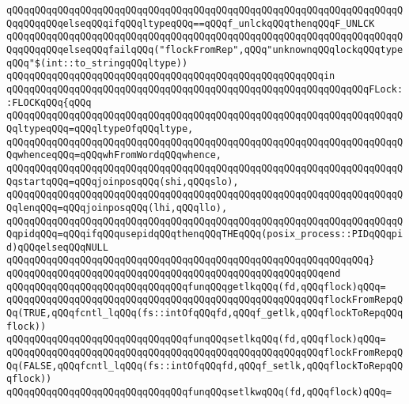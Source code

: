 \verb|qQQqqQQqqQQqqQQqqQQqqQQqqQQqqQQqqQQqqQQqqQQqqQQqqQQqqQQqqQQqqQQqqQQqqQQqqQQqqQQqelseqQQqifqQQqltypeqQQq==qQQqf_unlckqQQqthenqQQqF_UNLCK|\newline
\verb|qQQqqQQqqQQqqQQqqQQqqQQqqQQqqQQqqQQqqQQqqQQqqQQqqQQqqQQqqQQqqQQqqQQqqQQqqQQqqQQqelseqQQqfailqQQq("flockFromRep",qQQq"unknownqQQqlockqQQqtypeqQQq"$(int::to_stringqQQqltype))|\newline
\verb|qQQqqQQqqQQqqQQqqQQqqQQqqQQqqQQqqQQqqQQqqQQqqQQqqQQqqQQqin|\newline
\verb|qQQqqQQqqQQqqQQqqQQqqQQqqQQqqQQqqQQqqQQqqQQqqQQqqQQqqQQqqQQqqQQqFLock::FLOCKqQQq{qQQq|\newline
\verb|qQQqqQQqqQQqqQQqqQQqqQQqqQQqqQQqqQQqqQQqqQQqqQQqqQQqqQQqqQQqqQQqqQQqqQQqltypeqQQq=qQQqltypeOfqQQqltype,|\newline
\verb|qQQqqQQqqQQqqQQqqQQqqQQqqQQqqQQqqQQqqQQqqQQqqQQqqQQqqQQqqQQqqQQqqQQqqQQqwhenceqQQq=qQQqwhFromWordqQQqwhence,|\newline
\verb|qQQqqQQqqQQqqQQqqQQqqQQqqQQqqQQqqQQqqQQqqQQqqQQqqQQqqQQqqQQqqQQqqQQqqQQqstartqQQq=qQQqjoinposqQQq(shi,qQQqslo),|\newline
\verb|qQQqqQQqqQQqqQQqqQQqqQQqqQQqqQQqqQQqqQQqqQQqqQQqqQQqqQQqqQQqqQQqqQQqqQQqlenqQQq=qQQqjoinposqQQq(lhi,qQQqllo),|\newline
\verb|qQQqqQQqqQQqqQQqqQQqqQQqqQQqqQQqqQQqqQQqqQQqqQQqqQQqqQQqqQQqqQQqqQQqqQQqpidqQQq=qQQqifqQQqusepidqQQqthenqQQqTHEqQQq(posix_process::PIDqQQqpid)qQQqelseqQQqNULL|\newline
\verb|qQQqqQQqqQQqqQQqqQQqqQQqqQQqqQQqqQQqqQQqqQQqqQQqqQQqqQQqqQQqqQQq}|\newline
\verb|qQQqqQQqqQQqqQQqqQQqqQQqqQQqqQQqqQQqqQQqqQQqqQQqqQQqqQQqend|\newline
\newline
\verb|qQQqqQQqqQQqqQQqqQQqqQQqqQQqqQQqfunqQQqgetlkqQQq(fd,qQQqflock)qQQq=|\newline
\verb|qQQqqQQqqQQqqQQqqQQqqQQqqQQqqQQqqQQqqQQqqQQqqQQqqQQqqQQqflockFromRepqQQq(TRUE,qQQqfcntl_lqQQq(fs::intOfqQQqfd,qQQqf_getlk,qQQqflockToRepqQQqflock))|\newline
\verb|qQQqqQQqqQQqqQQqqQQqqQQqqQQqqQQqfunqQQqsetlkqQQq(fd,qQQqflock)qQQq=|\newline
\verb|qQQqqQQqqQQqqQQqqQQqqQQqqQQqqQQqqQQqqQQqqQQqqQQqqQQqqQQqflockFromRepqQQq(FALSE,qQQqfcntl_lqQQq(fs::intOfqQQqfd,qQQqf_setlk,qQQqflockToRepqQQqflock))|\newline
\verb|qQQqqQQqqQQqqQQqqQQqqQQqqQQqqQQqfunqQQqsetlkwqQQq(fd,qQQqflock)qQQq=|\newline
